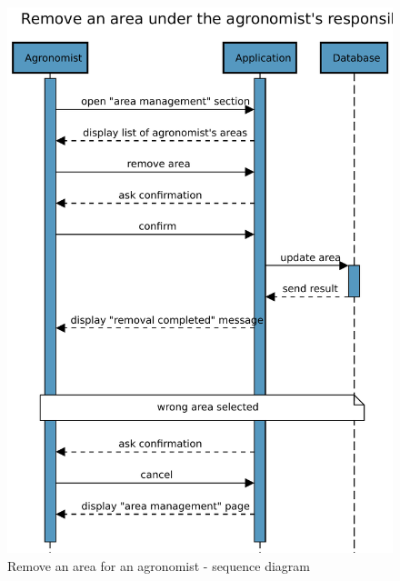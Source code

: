 \begin{figure}[H]
    \centering
    \includegraphics[scale=0.9]{Images/Sequence diagrams/Agronomist - remove area.pdf}

    \caption{Remove an area for an agronomist - sequence diagram}
    \label{fig:fig:seq_diag_insert_area}

    
\end{figure}


